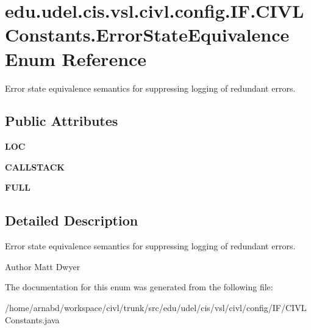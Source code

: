 \hypertarget{enumedu_1_1udel_1_1cis_1_1vsl_1_1civl_1_1config_1_1IF_1_1CIVLConstants_1_1ErrorStateEquivalence}{}\section{edu.\+udel.\+cis.\+vsl.\+civl.\+config.\+I\+F.\+C\+I\+V\+L\+Constants.\+Error\+State\+Equivalence Enum Reference}
\label{enumedu_1_1udel_1_1cis_1_1vsl_1_1civl_1_1config_1_1IF_1_1CIVLConstants_1_1ErrorStateEquivalence}


Error state equivalence semantics for suppressing logging of redundant errors.  


\subsection*{Public Attributes}
\begin{DoxyCompactItemize}
\item 
\hypertarget{enumedu_1_1udel_1_1cis_1_1vsl_1_1civl_1_1config_1_1IF_1_1CIVLConstants_1_1ErrorStateEquivalence_aa00037e7beb4478901dc1606419f846c}{}{\bfseries L\+O\+C}\label{enumedu_1_1udel_1_1cis_1_1vsl_1_1civl_1_1config_1_1IF_1_1CIVLConstants_1_1ErrorStateEquivalence_aa00037e7beb4478901dc1606419f846c}

\item 
\hypertarget{enumedu_1_1udel_1_1cis_1_1vsl_1_1civl_1_1config_1_1IF_1_1CIVLConstants_1_1ErrorStateEquivalence_a95606a7de9a0b9a610cdcc51aa1dfb9d}{}{\bfseries C\+A\+L\+L\+S\+T\+A\+C\+K}\label{enumedu_1_1udel_1_1cis_1_1vsl_1_1civl_1_1config_1_1IF_1_1CIVLConstants_1_1ErrorStateEquivalence_a95606a7de9a0b9a610cdcc51aa1dfb9d}

\item 
\hypertarget{enumedu_1_1udel_1_1cis_1_1vsl_1_1civl_1_1config_1_1IF_1_1CIVLConstants_1_1ErrorStateEquivalence_a03898b6873df48d334b00bd340b42ba1}{}{\bfseries F\+U\+L\+L}\label{enumedu_1_1udel_1_1cis_1_1vsl_1_1civl_1_1config_1_1IF_1_1CIVLConstants_1_1ErrorStateEquivalence_a03898b6873df48d334b00bd340b42ba1}

\end{DoxyCompactItemize}


\subsection{Detailed Description}
Error state equivalence semantics for suppressing logging of redundant errors. 

\begin{DoxyAuthor}{Author}
Matt Dwyer 
\end{DoxyAuthor}


The documentation for this enum was generated from the following file\+:\begin{DoxyCompactItemize}
\item 
/home/arnabd/workspace/civl/trunk/src/edu/udel/cis/vsl/civl/config/\+I\+F/C\+I\+V\+L\+Constants.\+java\end{DoxyCompactItemize}
